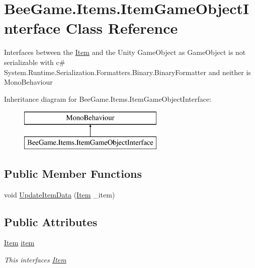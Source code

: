 \hypertarget{class_bee_game_1_1_items_1_1_item_game_object_interface}{}\section{Bee\+Game.\+Items.\+Item\+Game\+Object\+Interface Class Reference}
\label{class_bee_game_1_1_items_1_1_item_game_object_interface}


Interfaces between the \hyperlink{struct_bee_game_1_1_items_1_1_item}{Item} and the Unity Game\+Object as Game\+Object is not serializable with c\# System.\+Runtime.\+Serialization.\+Formatters.\+Binary.\+Binary\+Formatter and neither is Mono\+Behaviour  


Inheritance diagram for Bee\+Game.\+Items.\+Item\+Game\+Object\+Interface\+:\begin{figure}[H]
\begin{center}
\leavevmode
\includegraphics[height=2.000000cm]{class_bee_game_1_1_items_1_1_item_game_object_interface}
\end{center}
\end{figure}
\subsection*{Public Member Functions}
\begin{DoxyCompactItemize}
\item 
void \hyperlink{class_bee_game_1_1_items_1_1_item_game_object_interface_aa88fbff044f2dceb7633b1b41175d085}{Update\+Item\+Data} (\hyperlink{struct_bee_game_1_1_items_1_1_item}{Item} \+\_\+item)
\end{DoxyCompactItemize}
\subsection*{Public Attributes}
\begin{DoxyCompactItemize}
\item 
\hyperlink{struct_bee_game_1_1_items_1_1_item}{Item} \hyperlink{class_bee_game_1_1_items_1_1_item_game_object_interface_abe9476a5393ff778bd99f684b24886ad}{item}
\begin{DoxyCompactList}\small\item\em This interfaces \hyperlink{struct_bee_game_1_1_items_1_1_item}{Item} \end{DoxyCompactList}\end{DoxyCompactItemize}
